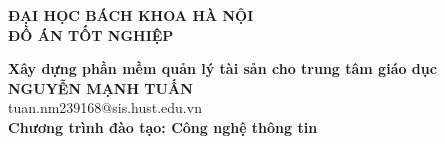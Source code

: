 \documentclass[DoAn.tex]{subfiles}
\begin{document}
\begin{titlepage}
\thispagestyle{empty}
\begin{center}

{\textbf{\large{ĐẠI HỌC BÁCH KHOA HÀ NỘI}}}\\[4cm]

{\textbf{\huge{ ĐỒ ÁN TỐT NGHIỆP}}}\\[1cm]
{\textbf{\Large{Xây dựng phần mềm quản lý tài sản cho trung tâm giáo dục}}\\[1cm]

{\textbf{\large{NGUYỄN MẠNH TUẤN}}}\\
{\large{tuan.nm239168@sis.hust.edu.vn}}\\[0.5cm]

{\textbf{\large{Chương trình đào tạo: Công nghệ thông tin
}}}\\

\vspace{4cm}
\begin{table}[H]
\centering
{}
\end{table}}
\end{center}

\end{titlepage}
\end{document}
